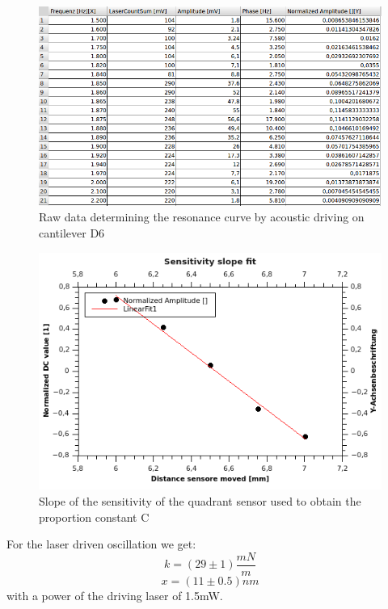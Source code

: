 \documentclass[12pt,a4paper]{article}
\begin{document}
\begin{figure}[H]
	\centering
	\includegraphics[scale=0.6]{../figures/rohdaten.png}
	\caption{Raw data determining the resonance curve by acoustic driving on cantilever D6}
	\label{fig:resonanzkurvedata}
\end{figure}


\begin{figure}[H]
	\centering
	\includegraphics[scale=2]{../figures/Slopeofsensitivityofthesensor.png}
	\caption{Slope of the sensitivity of the quadrant sensor used to obtain the proportion constant C}
	\label{fig:sensorsensitivity}
\end{figure}

\noindent
For the laser driven oscillation we get:
$$k = (29 \pm 1) \frac{mN}{m}$$
$$x = (11 \pm 0.5) nm$$
with a power of the driving laser of 1.5mW.

\end{document}

